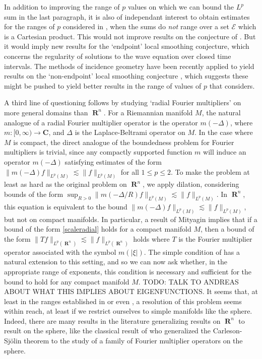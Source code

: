 \documentclass[12pt]{article}
\DeclareMathOperator{\RR}{\mathbf{R}}
\theoremstyle{plain}
\theoremstyle{remark}
\theoremstyle{definition}
\begin{document}
In addition to improving the range of $p$ values on which we can bound the $L^p$ sum in the last paragraph, it is also of independant interest to obtain estimates for the ranges of $p$ considered in \cite{Cladek}, when the sums do \emph{not} range over a set $\mathcal{E}$ which is a Cartesian product. This would not improve results on the conjecture of \cite{GarrigosandSeeger}. But it would imply new results for the `endpoint' local smoothing conjecture, which concerns the regularity of solutions to the wave equation over closed time intervals. The methods of incidence geometry have been recently applied to yield results on the `non-endpoint' local smoothing conjecture \cite{GuthandWangandZhang}, which suggests these might be pushed to yield better results in the range of values of $p$ that \cite{Cladek} considers.

A third line of questioning follows by studying `radial Fourier multipliers' on more general domains than $\RR^n$. For a Riemannian manifold $M$, the natural analogue of a radial Fourier multiplier operator is the operator $m(-\Delta)$, where $m: [0,\infty) \to \mathbf{C}$, and $\Delta$ is the Laplace-Beltrami operator on $M$. In the case where $M$ is compact, the direct analogue of the boundedness problem for Fourier multipliers is trivial, since any compactly supported function $m$ will induce an operator $m(-\Delta)$ satisfying estimates of the form $\| m(-\Delta) f \|_{L^p(M)} \lesssim \| f \|_{L^p(M)}$ for all $1 \leq p \leq 2$. To make the problem at least as hard as the original problem on $\RR^n$, we apply dilation, considering bounds of the form $\sup_{R > 0} \| m(-\Delta/R) f \|_{L^p(M)} \lesssim \| f \|_{L^p(M)}$. In $\RR^n$, this equation is equivalent to the bound $\| m(-\Delta) f \|_{L^p(M)} \lesssim \| f \|_{L^p(M)}$, but not on compact manifolds. In particular, a result of Mityagin implies that if a bound of the form \eqref{scaleradial} holds for a compact manifold $M$, then a bound of the form $\| Tf \|_{L^p(\RR^n)} \lesssim \| f \|_{L^p(\RR^n)}$ holds where $T$ is the Fourier multiplier operator associated with the symbol $m(|\xi|)$. The simple condition of \cite{GarrigosandSeeger} has a natural extension to this setting, and so we can now ask whether, in the appropriate range of exponents, this condition is necessary and sufficient for the bound to hold for any compact manifold $M$. TODO: TALK TO ANDREAS ABOUT WHAT THIS IMPLIES ABOUT EIGENFUNCTIONS. It seems that, at least in the ranges established in \cite{HeoandNazarovandSeeger} or even \cite{Cladek}, a resolution of this problem seems within reach, at least if we restrict ourselves to simple manifolds like the sphere. Indeed, there are many results in the literature generalizing results on $\RR^n$ to result on the sphere, like the classical result of \cite{Sogge} who generalized the Carleson-Sj\"{o}lin theorem to the study of a family of Fourier multiplier operators on the sphere.
\end{document}
